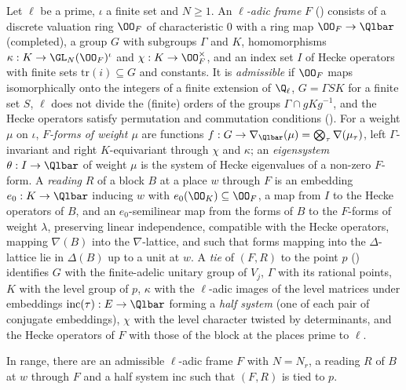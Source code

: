 \begin{definition}\label{pf:onto2:framedef}
Let $\ell$ be a prime, $\iota$ a finite set and $N\ge1$. An \emph{$\ell$-adic frame} $F$ () consists
of a discrete valuation ring $\OO_F$ of characteristic $0$ with a ring map $\OO_F\to\Qlbar$ (completed), a group $G$ with subgroups $\Gamma$
and $K$, homomorphisms $\kappa:K\to\GL_N(\OO_F)^\iota$ and $\chi:K\to\OO_F^\times$, and an index set $I$ of Hecke operators with finite
sets $\mathrm{tr}(i)\subseteq G$ and constants. It is \emph{admissible} if $\OO_F$ maps isomorphically onto the integers of a finite
extension of $\Q_\ell$, $G=\Gamma S K$ for a finite set $S$, $\ell$ does not divide the (finite) orders of the groups
$\Gamma\cap gKg^{-1}$, and the Hecke operators satisfy permutation and commutation conditions
(). For a weight $\mu$ on $\iota$, \emph{$F$-forms of weight $\mu$} are functions
$f:G\to\nabla_{\Qlbar}(\mu)=\bigotimes_\tau\nabla(\mu_\tau)$, left $\Gamma$-invariant and right $K$-equivariant through $\chi$ and $\kappa$;
an \emph{eigensystem} $\theta:I\to\Qlbar$ of weight $\mu$ is the system of Hecke eigenvalues of a non-zero $F$-form. A \emph{reading}
$R$ of a block $B$ at a place $w$ through $F$ is an embedding $e_0:K\to\Qlbar$ inducing $w$
with $e_0(\OO_K)\subseteq\OO_F$, a map from $I$ to the Hecke operators of $B$, and an $e_0$-semilinear map from the forms of $B$ to the
$F$-forms of weight $\lambda$, preserving linear independence, compatible with the Hecke operators, mapping $\nabla(B)$ into the
$\nabla$-lattice, and such that forms mapping into the $\Delta$-lattice lie in $\Delta(B)$ up to a unit at $w$. A \emph{tie} of $(F,R)$ to
the point $p$ () identifies $G$ with the finite-adelic unitary group of $V_j$, $\Gamma$ with its
rational points, $K$ with the level group of $p$, $\kappa$ with the $\ell$-adic images of the level matrices under embeddings
$\mathrm{inc}(\tau):E\to\Qlbar$ forming a \emph{half system} (one of each pair of conjugate embeddings), $\chi$ with the level character
twisted by determinants, and the Hecke operators of $F$ with those of the block at the places prime to $\ell$.
\end{definition}

\begin{proposition}\label{pf:onto2:frame}
In range, there are an admissible $\ell$-adic frame $F$ with $N=N_r$, a reading $R$ of $B$ at $w$ through $F$ and a half system
$\mathrm{inc}$ such that $(F,R)$ is tied to $p$.
\end{proposition}

